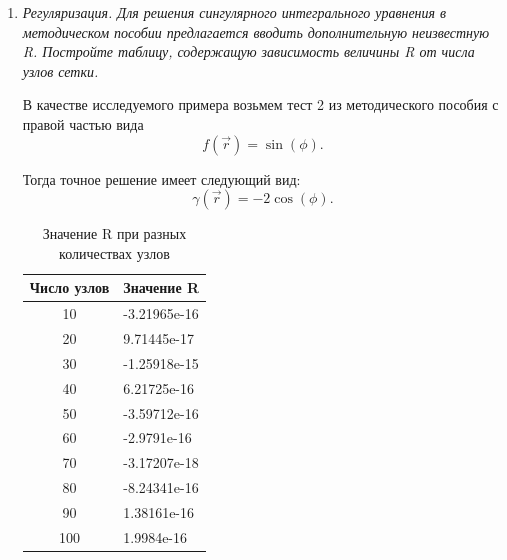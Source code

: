 \documentclass[12pt, a4paper]{article}
\begin{document}
\begin{enumerate}
		\item \textit{Регуляризация. Для решения сингулярного интегрального уравнения в методическом пособии предлагается вводить дополнительную неизвестную R. Постройте таблицу, содержащую зависимость величины R от числа узлов сетки.}
		
		В качестве исследуемого примера возьмем тест 2 из методического пособия с правой частью вида
		\[
		f(\vec{r}) = \sin(\phi).
		\]
		
		Тогда точное решение имеет следующий вид:
		\[
		\gamma(\vec{r}) = -2 \cos(\phi).
		\]
		
		\begin{table}[H]
			\caption{Значение R при разных количествах узлов}
			\centering
			\begin{tabular}{|c|l|}
				\hline
				Число узлов & Значение R              \\ \hline
				10      & -3.21965e-16            \\ \hline
				20      & \hphantom{-}9.71445e-17 \\ \hline
				30      & -1.25918e-15            \\ \hline
				40      & \hphantom{-}6.21725e-16 \\ \hline
				50      & -3.59712e-16            \\ \hline
				60      & -2.9791e-16             \\ \hline
				70      & -3.17207e-18            \\ \hline
				80      & -8.24341e-16            \\ \hline
				90      & \hphantom{-}1.38161e-16 \\ \hline
				100     & \hphantom{-}1.9984e-16  \\ \hline
			\end{tabular}
		\end{table}
		
		
	\end{enumerate}
	
	\newpage
\end{document}
